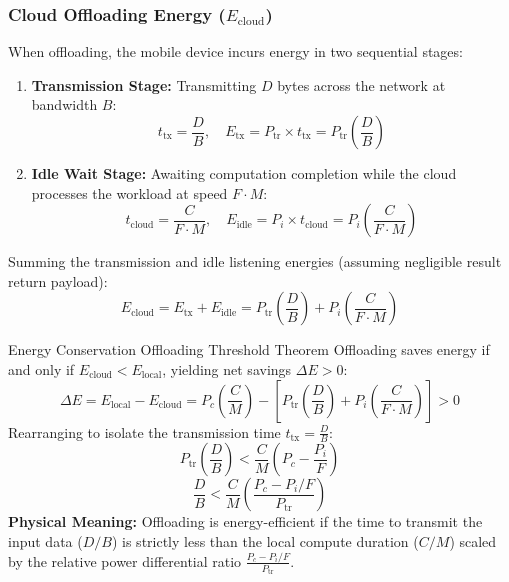 \documentclass[11pt,a4paper,openany]{report}
\begin{document}
\subsubsection{Cloud Offloading Energy ($E_{\text{cloud}}$)}
When offloading, the mobile device incurs energy in two sequential stages:
\begin{enumerate}[leftmargin=*]
  \item \textbf{Transmission Stage:} Transmitting $D$ bytes across the network at bandwidth $B$:
  \begin{equation}
  t_{\text{tx}} = \frac{D}{B}, \quad E_{\text{tx}} = P_{\text{tr}} \times t_{\text{tx}} = P_{\text{tr}} \left( \frac{D}{B} \right)
  \end{equation}
  \item \textbf{Idle Wait Stage:} Awaiting computation completion while the cloud processes the workload at speed $F \cdot M$:
  \begin{equation}
  t_{\text{cloud}} = \frac{C}{F \cdot M}, \quad E_{\text{idle}} = P_i \times t_{\text{cloud}} = P_i \left( \frac{C}{F \cdot M} \right)
  \end{equation}
\end{enumerate}
Summing the transmission and idle listening energies (assuming negligible result return payload):
\begin{equation}
E_{\text{cloud}} = E_{\text{tx}} + E_{\text{idle}} = P_{\text{tr}} \left( \frac{D}{B} \right) + P_i \left( \frac{C}{F \cdot M} \right)
\end{equation}

\begin{thmbox}{Energy Conservation Offloading Threshold Theorem}
Offloading saves energy if and only if $E_{\text{cloud}} < E_{\text{local}}$, yielding net savings $\Delta E > 0$:
\begin{equation}
\Delta E = E_{\text{local}} - E_{\text{cloud}} = P_c \left( \frac{C}{M} \right) - \left[ P_{\text{tr}} \left( \frac{D}{B} \right) + P_i \left( \frac{C}{F \cdot M} \right) \right] > 0
\end{equation}
Rearranging to isolate the transmission time $t_{\text{tx}} = \frac{D}{B}$:
\begin{equation}
P_{\text{tr}} \left( \frac{D}{B} \right) < \frac{C}{M} \left( P_c - \frac{P_i}{F} \right)
\end{equation}
\begin{equation}
\frac{D}{B} < \frac{C}{M} \left( \frac{P_c - P_i / F}{P_{\text{tr}}} \right)
\end{equation}
\textbf{Physical Meaning:} Offloading is energy-efficient if the time to transmit the input data ($D/B$) is strictly less than the local compute duration ($C/M$) scaled by the relative power differential ratio $\frac{P_c - P_i/F}{P_{\text{tr}}}$.
\end{thmbox}
\end{document}
